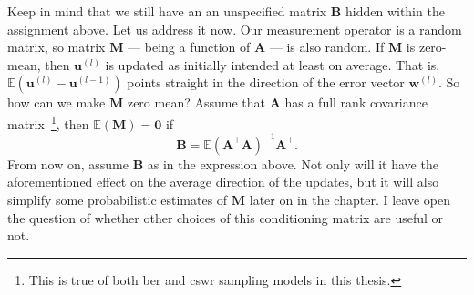Keep in mind that we still have an an unspecified matrix $\mathbf{B}$ hidden within the assignment above. Let us address it now. Our measurement operator is a random matrix, so matrix $\mathbf{M}$ --- being a function of $\mathbf{A}$ --- is also random. If $\mathbf{M}$ is zero-mean, then $\mathbf{u}^{(l)}$ is updated as initially intended at least on average. That is, $\mathbb{E} \left ( \mathbf{u}^{(l)} - \mathbf{u}^{(l-1)} \right )$ points straight in the direction of the error vector $\mathbf{w}^{(l)}$. So how can we make $\mathbf{M}$ zero mean? Assume that $\mathbf{A}$ has a full rank covariance matrix~\footnote{This is true of both \acrshort{ber} and \acrshort{cswr} sampling models in this thesis.}, then $\mathbb{E} \left ( \mathbf{M} \right ) = \mathbf{0}$ if
\begin{equation}
    \mathbf{B} = \mathbb{E} \left ( \mathbf{A}^{\top}\mathbf{A} \right )^{-1}\mathbf{A}^{\top}.
\end{equation}
From now on, assume $\mathbf{B}$ as in the expression above. Not only will it have the aforementioned effect on the average direction of the updates, but it will also simplify some probabilistic estimates of $\mathbf{M}$ later on in the chapter. I leave open the question of whether other choices of this conditioning matrix are useful or not.

